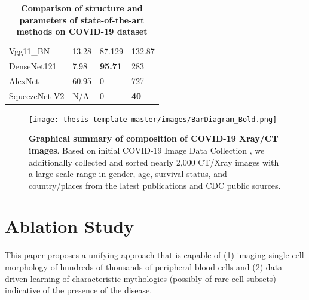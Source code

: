 \begin{table}[h]
\begin{tabular}{@{}llll@{}}
Vgg11\_BN     & 13.28                                                                           & 87.129                                                                            & 132.87                                                                        \\
DenseNet121   & 7.98                                                                            & {\color[HTML]{CB0000} \textbf{95.71}}                                             & 283                                                                           \\
AlexNet       & 60.95                                                                           & 0                                                                                 & 727                                                                           \\
SqueezeNet V2 & {\color[HTML]{000000} N/A}                                                      & 0                                                                                 & {\color[HTML]{CB0000} \textbf{40}}                                            \\ \bottomrule
\end{tabular}
\caption{\textbf{Comparison of structure and parameters of state-of-the-art methods on COVID-19 dataset}}
\end{table}

\begin{figure}[b]
\texttt{[image: thesis-template-master/images/BarDiagram\_Bold.png]}
\label{fig}
\centering
\caption{\textbf{Graphical summary of composition of COVID-19 Xray/CT images}. Based on initial COVID-19 Image Data Collection \cite{37}, we additionally collected and sorted nearly 2,000 CT/Xray images with a large-scale range in gender, age, survival status, and country/places from the latest publications and CDC public sources\cite{36}\cite{37}\cite{38}. }
\end{figure}


\chapter{Ablation Study}
\label{sec:examples}

This paper proposes a unifying approach that is capable of (1) imaging single-cell morphology of hundreds of thousands of peripheral blood cells and (2) data-driven learning of characteristic mythologies (possibly of rare cell subsets) indicative of the presence of the disease.

